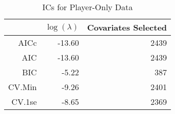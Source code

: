 \begin{table}[ht]
\centering
\begin{tabular}{rrr}
  \hline
 & $\log(\lambda)$ & Covariates Selected \\ 
  \hline
AICc & -13.60 & 2439 \\ 
  AIC & -13.60 & 2439 \\ 
  BIC & -5.22 & 387 \\ 
  CV.Min & -9.26 & 2401 \\ 
  CV.1se & -8.65 & 2369 \\ 
   \hline
\end{tabular}
\caption{ICs for Player-Only Data} 
\label{tab:pl_ic}
\end{table}
